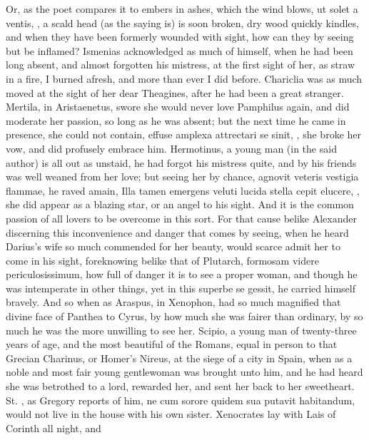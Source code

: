 Or, as the poet compares it to embers in ashes, which the wind blows,
ut solet a ventis, \etc{}, a scald head (as the saying is) is soon
broken, dry wood quickly kindles, and when they have been formerly
wounded with sight, how can they by seeing but be inflamed? Ismenias
acknowledged as much of himself, when he had been long absent, and
almost forgotten his mistress, at the first sight of her, as
straw in a fire, I burned afresh, and more than ever I did before.
Chariclia was as much moved at the sight of her dear Theagines,
after he had been a great stranger. Mertila, in Aristaenetus,
swore she would never love Pamphilus again, and did moderate her
passion, so long as he was absent; but the next time he came in
presence, she could not contain, effuse amplexa attrectari se sinit,
\etc{}, she broke her vow, and did profusely embrace him. Hermotinus, a
young man (in the said author) is all out as unstaid, he had
forgot his mistress quite, and by his friends was well weaned from her
love; but seeing her by chance, agnovit veteris vestigia flammae, he
raved amain, Illa tamen emergens veluti lucida stella cepit elucere,
\etc{}, she did appear as a blazing star, or an angel to his sight. And it
is the common passion of all lovers to be overcome in this sort. For
that cause belike Alexander discerning this inconvenience and danger
that comes by seeing, when he heard Darius's wife so much
commended for her beauty, would scarce admit her to come in his sight,
foreknowing belike that of Plutarch, formosam videre periculosissimum,
how full of danger it is to see a proper woman, and though he was
intemperate in other things, yet in this superbe se gessit, he carried
himself bravely. And so when as Araspus, in Xenophon, had so much
magnified that divine face of Panthea to Cyrus, by how much she
was fairer than ordinary, by so much he was the more unwilling to see
her. Scipio, a young man of twenty-three years of age, and the most
beautiful of the Romans, equal in person to that Grecian Charinus, or
Homer's Nireus, at the siege of a city in Spain, when as a noble and
most fair young gentlewoman was brought unto him, and he had
heard she was betrothed to a lord, rewarded her, and sent her back to
her sweetheart. St. \Austin{}, as Gregory reports of him, ne cum
sorore quidem sua putavit habitandum, would not live in the house with
his own sister. Xenocrates lay with Lais of Corinth all night, and
